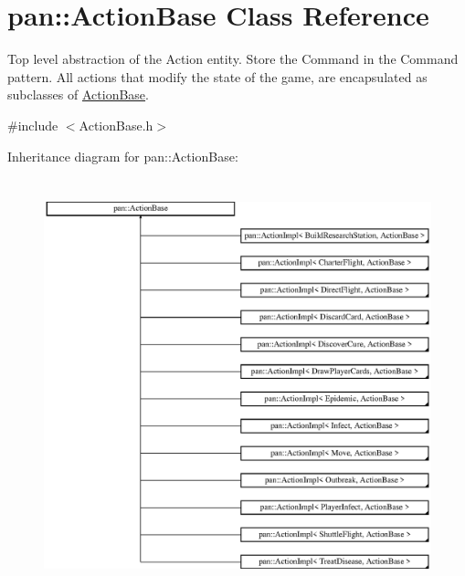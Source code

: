 \hypertarget{classpan_1_1_action_base}{}\section{pan\+:\+:Action\+Base Class Reference}
\label{classpan_1_1_action_base}


Top level abstraction of the Action entity. Store the Command in the Command pattern. All actions that modify the state of the game, are encapsulated as subclasses of \hyperlink{classpan_1_1_action_base}{Action\+Base}.  




{\ttfamily \#include $<$Action\+Base.\+h$>$}

Inheritance diagram for pan\+:\+:Action\+Base\+:\begin{figure}[H]
\begin{center}
\leavevmode
\includegraphics[height=12.000000cm]{classpan_1_1_action_base}
\end{center}
\end{figure}
